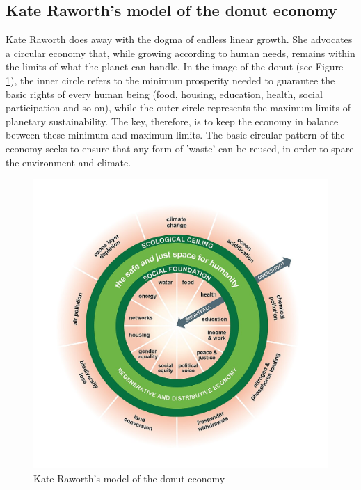 \documentclass[../summary.tex]{subfiles}
\begin{document}
	\subsection{Kate Raworth's model of the donut economy}
	
	Kate Raworth does away with the dogma of endless linear growth. She advocates a circular economy that, while growing according to human needs, remains within the limits of what the planet can handle. In the image of the donut (see Figure \ref{fig:donut-economy}), the inner circle refers to the minimum prosperity needed to guarantee the basic rights of every human being (food, housing, education, health, social participation and so on), while the outer circle represents the maximum limits of planetary sustainability. The key, therefore, is to keep the economy in balance between these minimum and maximum limits. The basic circular pattern of the economy seeks to ensure that any form of 'waste' can be reused, in order to spare the environment and climate.
	
	 \begin{figure}[htbp]
		\centering
		\includegraphics[width=1\linewidth]{images/11-donut-economy.png}
		\caption{Kate Raworth's model of the donut economy}
		\label{fig:donut-economy}
	\end{figure}
	
\end{document}
